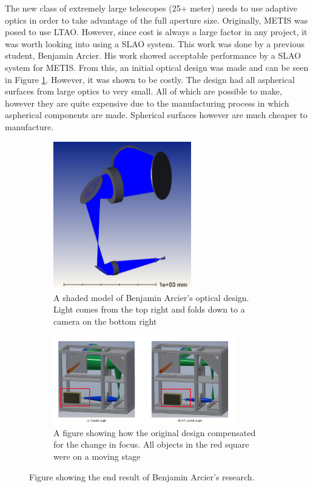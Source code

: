 The new class of extremely large telescopes (25+ meter) needs to use adaptive optics
in order to take advantage of the full aperture size.  Originally, METIS was posed
to use LTAO.  However, since cost is always a large factor in any project, it was
worth looking into using a SLAO system.  This work was done by a previous student,
Benjamin Arcier.  His work showed acceptable performance by a SLAO system for METIS.
From this, an initial optical design was made and can be seen in Figure
\ref{fig:ben_optic}.  However, it was shown to be costly.  The design had all
aspherical surfaces from large optics to very small.  All of which are possible to
make, however they are quite expensive due to the manufacturing process in
which aspherical components are made.  Spherical surfaces however are much cheaper
to manufacture.



\begin{figure}[h!]
\centering
\begin{subfigure}{.5\textwidth}
  \centering
  \includegraphics[width=6cm]{Figures/Ben_optic_design.png}
  \caption{A shaded model of Benjamin Arcier's optical design.  Light comes from the top right and folds down to a camera on the bottom right}
  \label{fig:ben_optic}
\end{subfigure}%
\begin{subfigure}{.5\textwidth}
  \centering
  \includegraphics[width=8cm]{Figures/camera_change.png}
  \caption{A figure showing how the original design compensated for the change in focus.  All objects in the red square were on a moving stage}
  \label{fig:camera_change}
\end{subfigure}
\caption{Figure showing the end result of Benjamin Arcier's research.\cite{arcier}}
\label{fig:pickup}
\end{figure}

